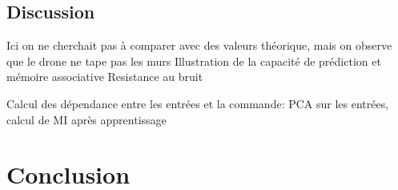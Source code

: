 \subsection{Discussion}
Ici on ne cherchait pas à comparer avec des valeurs théorique, mais on observe que le drone ne tape pas les murs
Illustration de la capacité de prédiction et mémoire associative
Resistance au bruit

Calcul des dépendance entre les entrées et la commande:
PCA sur les entrées, calcul de MI après apprentissage
\section{Conclusion}





